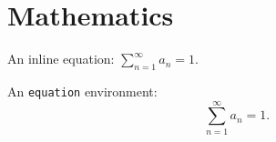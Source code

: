 \documentclass[12pt]{article}
\theoremstyle{plain}
\theoremstyle{definition}
\theoremstyle{remark}
\theoremstyle{mystyle}
\begin{document}
%
%
%
%

\section{Mathematics}

An inline equation: $\sum_{n=1}^{\infty} a_n = 1$.

\bigskip
An \texttt{equation} environment:
\begin{equation}
\sum_{n=1}^{\infty} a_n = 1.
\end{equation}
\end{document}
